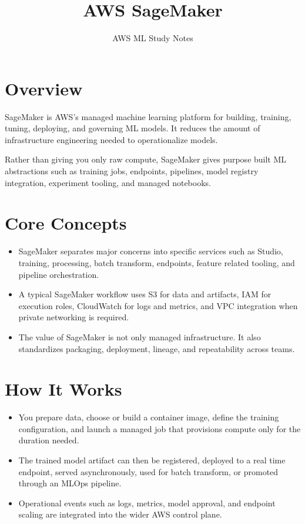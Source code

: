 \documentclass[10pt,twocolumn]{article}
\begin{document}
\title{\vspace{-1.6cm}AWS SageMaker}
\author{AWS ML Study Notes}
\date{}
\maketitle
\small

\section*{Overview}
SageMaker is AWS's managed machine learning platform for building, training, tuning, deploying, and governing ML models. It reduces the amount of infrastructure engineering needed to operationalize models.

Rather than giving you only raw compute, SageMaker gives purpose built ML abstractions such as training jobs, endpoints, pipelines, model registry integration, experiment tooling, and managed notebooks.

\section*{Core Concepts}
\begin{itemize}
\item SageMaker separates major concerns into specific services such as Studio, training, processing, batch transform, endpoints, feature related tooling, and pipeline orchestration.
\item A typical SageMaker workflow uses S3 for data and artifacts, IAM for execution roles, CloudWatch for logs and metrics, and VPC integration when private networking is required.
\item The value of SageMaker is not only managed infrastructure. It also standardizes packaging, deployment, lineage, and repeatability across teams.
\end{itemize}

\section*{How It Works}
\begin{itemize}
\item You prepare data, choose or build a container image, define the training configuration, and launch a managed job that provisions compute only for the duration needed.
\item The trained model artifact can then be registered, deployed to a real time endpoint, served asynchronously, used for batch transform, or promoted through an MLOps pipeline.
\item Operational events such as logs, metrics, model approval, and endpoint scaling are integrated into the wider AWS control plane.
\end{itemize}
\end{document}
